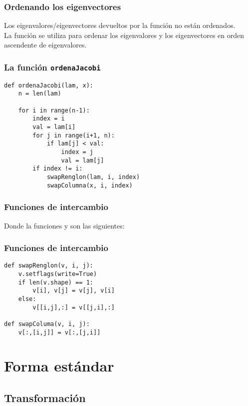 \documentclass[12pt]{beamer}
\begin{document}
\begin{frame}
\frametitle{Ordenando los eigenvectores}
Los eigenvalores/eigenvectores devueltos por la función  no están ordenados.
\\
\bigskip
\pause
La función  se utiliza para ordenar los eigenvalores y los eigenvectores en orden ascendente de eigenvalores.
\end{frame}
\begin{frame}
\frametitle{La función \texttt{ordenaJacobi}}
\begin{lstlisting}[caption=La función para ordenar los eigenvalores y eigenvectores]
def ordenaJacobi(lam, x):
    n = len(lam)
    
    for i in range(n-1):
        index = i
        val = lam[i]
        for j in range(i+1, n):
            if lam[j] < val:
                index = j
                val = lam[j]
        if index != i:
            swapRenglon(lam, i, index)
            swapColumna(x, i, index)
\end{lstlisting}
\end{frame}
\begin{frame}
\frametitle{Funciones de intercambio}
Donde la funciones  y  son las siguientes:
\end{frame}
\begin{frame}[fragile]
\frametitle{Funciones de intercambio}
\begin{lstlisting}[caption=Funciones de intercambio de renglones y columnas]
def swapRenglon(v, i, j):
    v.setflags(write=True)
    if len(v.shape) == 1:
        v[i], v[j] = v[j], v[i]
    else:
        v[[i,j],:] = v[[j,i],:]
        
def swapColuma(v, i, j):
    v[:,[i,j]] = v[:,[j,i]]
\end{lstlisting}
\end{frame}

\section{Forma estándar}
\subsection{Transformación}
\end{document}
